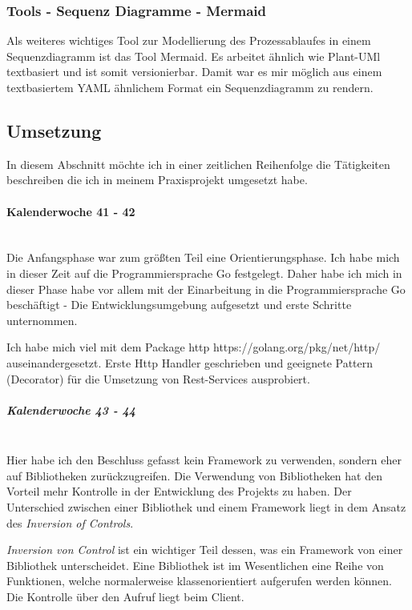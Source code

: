 \documentclass[12pt]{article}
\begin{document}
\subsubsection{Tools - Sequenz Diagramme - Mermaid}

Als weiteres wichtiges Tool zur Modellierung des Prozessablaufes in einem Sequenzdiagramm ist das Tool Mermaid. Es arbeitet ähnlich wie Plant-UMl textbasiert und ist somit versionierbar. Damit war es mir möglich aus einem textbasiertem YAML ähnlichem Format ein Sequenzdiagramm zu rendern.
\newpage
\subsection{Umsetzung}

In diesem Abschnitt möchte ich in einer zeitlichen Reihenfolge die Tätigkeiten beschreiben die ich in meinem Praxisprojekt umgesetzt habe.

\paragraph{Kalenderwoche 41 - 42}\mbox{}\\

Die Anfangsphase war zum größten Teil eine Orientierungsphase. Ich habe mich in dieser Zeit auf die Programmiersprache Go festgelegt. Daher habe ich mich in dieser Phase habe vor allem mit der Einarbeitung in die Programmiersprache Go beschäftigt - Die Entwicklungsumgebung aufgesetzt und erste Schritte unternommen.

Ich habe mich viel mit dem Package http https://golang.org/pkg/net/http/ auseinandergesetzt. Erste Http Handler geschrieben und geeignete Pattern (Decorator) für die Umsetzung von Rest-Services ausprobiert.

\subparagraph{Kalenderwoche 43 - 44}\mbox{}\\

Hier habe ich den Beschluss gefasst kein Framework zu verwenden, sondern eher auf Bibliotheken zurückzugreifen. Die Verwendung von Bibliotheken hat den Vorteil mehr Kontrolle in der Entwicklung des Projekts zu haben. Der Unterschied zwischen einer Bibliothek und einem Framework liegt in dem Ansatz des \textit{Inversion of Controls}.

\textit{Inversion von Control} ist ein wichtiger Teil dessen, was ein Framework von einer Bibliothek unterscheidet. Eine Bibliothek ist im Wesentlichen eine Reihe von Funktionen, welche normalerweise klassenorientiert aufgerufen werden können. Die Kontrolle über den Aufruf liegt beim Client.
\end{document}

